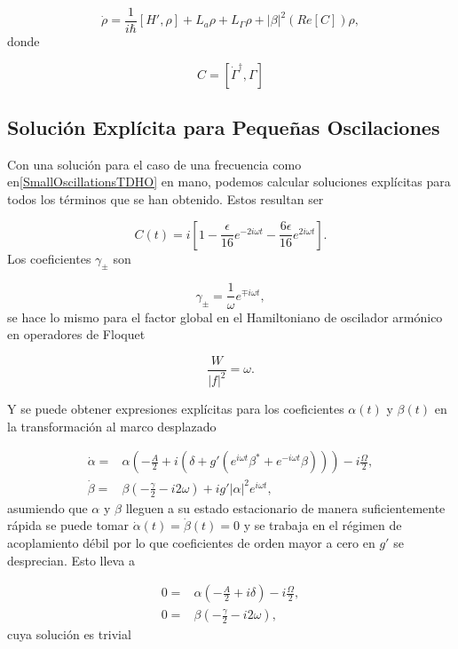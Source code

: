 \documentclass[10pt,a4paper]{report}
\begin{document}
\begin{equation}\label{DLCMasterEquation}
\dot{\rho} = \frac{1}{i\hbar}[H',\rho] + L_a\rho + L_\Gamma\rho + |\beta|^2(Re[C])\rho,
\end{equation} donde 

\begin{equation}
C = [\dot{\Gamma}^\dagger, \Gamma]
\end{equation} 


\subsection{Solución Explícita para Pequeñas Oscilaciones }

Con una solución para el caso de una frecuencia como en\eqref{SmallOscillationsTDHO}  en mano, podemos calcular soluciones explícitas para todos los términos que se han obtenido. Estos resultan ser\cite{TesisMaestria}

\begin{equation}
C(t) = i [1 -\frac{\epsilon}{16}e^{-2i\omega t}-\frac{6\epsilon}{16}e^{2i\omega t}].
\end{equation} Los coeficientes $\gamma_{\pm}$ son

\begin{equation}
\gamma_\pm= \frac{1}{\omega}e^{\mp i\omega t},
\end{equation} se hace lo mismo para el factor global en el Hamiltoniano de oscilador armónico en operadores de Floquet

\begin{equation}
\frac{W}{|f|^2} = \omega.
\end{equation} 

Y se puede obtener expresiones explícitas para los coeficientes $\alpha(t)$ y $\beta(t)$ en la transformación al marco desplazado

\begin{align}
\dot{\alpha} =& \alpha(-\frac{A}{2}+i(\delta+g'(e^{i\omega t} \beta^* + e^{-i\omega t} \beta)))-i\frac{\Omega}{2},\\
\dot{\beta} =& \beta(-\frac{\gamma}{2}-i 2\omega)+ig'|\alpha|^2e^{i\omega t},
\end{align} asumiendo que $\alpha$ y $\beta$ lleguen a su estado estacionario de manera suficientemente rápida se puede tomar $\dot{\alpha}(t)=\dot{\beta}(t)=0$ y se trabaja
en el régimen de acoplamiento débil por lo que coeficientes de orden
mayor a cero en $g'$ se desprecian. Esto lleva a

\begin{align}
0 =& \alpha(-\frac{A}{2}+i\delta)-i\frac{\Omega}{2},\\
0 =& \beta(-\frac{\gamma}{2}-i 2\omega),
\end{align} cuya solución es trivial 
\end{document}
